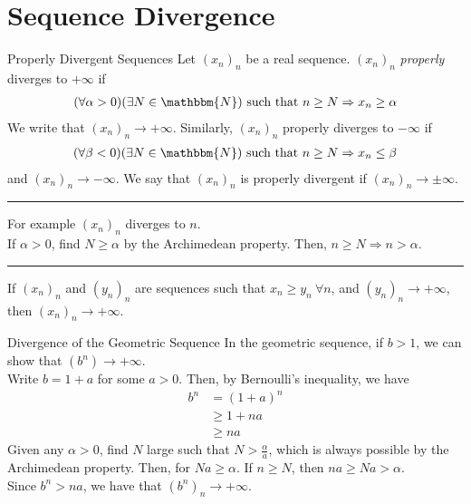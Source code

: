 \documentclass[10pt]{extarticle}
\newcommand{\N}{\mathbbm{N}}
\begin{document}
  \section{Sequence Divergence}%
  \begin{problem}{Properly Divergent Sequences}
    Let $(x_n)_n$ be a real sequence. $(x_n)_n$ \textsl{properly} diverges to $+\infty$ if
    \begin{align*}
      (\forall \alpha > 0)(\exists N\in\N) \text{ such that } n\geq N \Rightarrow x_{n} \geq \alpha
    \end{align*}
    We write that $(x_n)_n \rightarrow +\infty$. Similarly, $(x_n)_n$ properly diverges to $-\infty$ if
    \begin{align*}
      (\forall \beta < 0)(\exists N\in\N) \text{ such that } n\geq N \Rightarrow x_n \leq \beta
    \end{align*}
    and $(x_n)_n \rightarrow -\infty$. We say that $(x_n)_n$ is properly divergent if $(x_n)_n\rightarrow \pm \infty$.\\
    \vspace{4pt}
    \rule{\textwidth}{0.4pt}
    \vspace{4pt}
    For example $(x_n)_n$ diverges to $n$.\\

    If $\alpha > 0$, find $N \geq \alpha$ by the Archimedean property. Then, $n\geq N \Rightarrow n > \alpha$.\\
    \vspace{4pt}
    \rule{\textwidth}{0.4pt}
    \vspace{4pt}
    If $(x_n)_n$ and $(y_n)_n$ are sequences such that $x_n \geq y_n~\forall n$, and $(y_n)_n \rightarrow +\infty$, then $(x_n)_n \rightarrow +\infty$.
  \end{problem}
  \begin{problem}{Divergence of the Geometric Sequence}
    In the geometric sequence, if $b > 1$, we can show that $\left(b^n\right) \rightarrow +\infty$.\\

    Write $b = 1 + a$ for some $a > 0$. Then, by Bernoulli's inequality, we have
    \begin{align*}
      b^n &= (1+a)^n \\
          &\geq 1 + na\\
          &\geq na
    \end{align*}
    Given any $\alpha > 0$, find $N$ large such that $N > \frac{\alpha}{a}$, which is always possible by the Archimedean property. Then, for $Na \geq \alpha$. If $n\geq N$, then $na \geq Na > \alpha$.\\

    Since $b^n > na$, we have that $\left(b^n\right)_n \rightarrow +\infty$.
  \end{problem}
\end{document}
